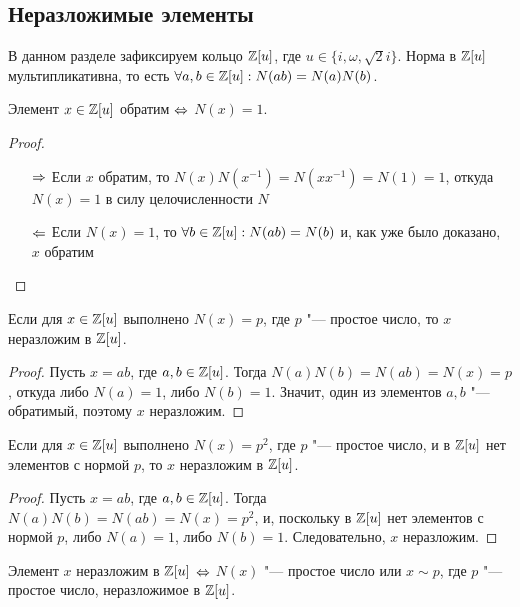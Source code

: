 \subsection{Неразложимые элементы}

В данном разделе зафиксируем кольцо $\mathbb{Z}[u]$, где $u \in \{i, \omega, \sqrt{2}i\}$. Норма в $\mathbb{Z}[u]$ мультипликативна, то есть $\forall a, b \in \mathbb{Z}[u]: N(ab) = N(a)N(b)$.

\begin{proposition}
	Элемент $x \in \mathbb{Z}[u]$ обратим $\Leftrightarrow$ $N(x) = 1$.
\end{proposition}

\begin{proof}~
	\begin{itemize}
		\item[$\Rightarrow$] Если $x$ обратим, то $N(x)N(x^{-1}) = N(xx^{-1}) = N(1) = 1$, откуда $N(x) = 1$ в силу целочисленности $N$
		\item[$\Leftarrow$] Если $N(x) = 1$, то $\forall b \in \mathbb{Z}[u]: N(ab) = N(b)$ и, как уже было доказано, $x$ обратим
	\end{itemize}
\end{proof}

\begin{proposition}
	Если для $x \in \mathbb{Z}[u]$ выполнено $N(x) = p$, где $p$ "--- простое число, то $x$ неразложим в $\mathbb{Z}[u]$.
\end{proposition}

\begin{proof}
	Пусть $x = ab$, где $a, b \in \mathbb{Z}[u]$. Тогда $N(a)N(b) = N(ab) = N(x) = p$, откуда либо $N(a) = 1$, либо $N(b) = 1$. Значит, один из элементов $a, b$ "--- обратимый, поэтому $x$ неразложим.
\end{proof}

\begin{proposition}
	Если для $x \in \mathbb{Z}[u]$ выполнено $N(x) = p^2$, где $p$ "--- простое число, и в $\mathbb{Z}[u]$ нет элементов с нормой $p$, то $x$ неразложим в $\mathbb{Z}[u]$.
\end{proposition}

\begin{proof}
	Пусть $x = ab$, где $a, b \in \mathbb{Z}[u]$. Тогда $N(a)N(b) = N(ab) = N(x) = p^2$, и, поскольку в $\mathbb{Z}[u]$ нет элементов с нормой $p$, либо $N(a) = 1$, либо $N(b) = 1$. Следовательно, $x$ неразложим.
\end{proof}

\begin{proposition}
	Элемент $x$ неразложим в $\mathbb{Z}[u]$ $\Leftrightarrow$ $N(x)$ "--- простое число или $x \sim p$, где $p$ "--- простое число, неразложимое в $\mathbb{Z}[u]$.
\end{proposition}